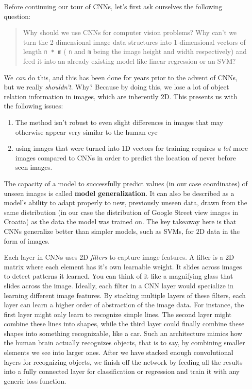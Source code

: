 \documentclass[]{article}
\providecommand{\tightlist}{%
  \setlength{\itemsep}{0pt}\setlength{\parskip}{0pt}}
\let\oldtexttt\texttt
\renewcommand{\texttt}[1]{
  \textcolor{tcolor}{\colorbox{bgcolor}{\oldtexttt{#1}}}
}
\begin{document}
Before continuing our tour of CNNs, let's first ask ourselves the
following question:

\begin{quote}
Why should we use CNNs for computer vision problems? Why can't we turn
the 2-dimensional image data structures into 1-dimensional vectors of
length \texttt{n\ *\ m} (\texttt{n} and \texttt{m} being the image
height and width respectively) and feed it into an already existing
model like linear regression or an SVM?
\end{quote}

We \emph{can} do this, and this has been done for years prior to the
advent of CNNs, but we really \emph{shouldn't}. Why? Because by doing
this, we lose a lot of object relation information in images, which are
inherently 2D. This presents us with the following issues:

\begin{enumerate}
\def\labelenumi{\arabic{enumi}.}
\tightlist
\item
  The method isn't robust to even slight differences in images that may
  otherwise appear very similar to the human eye
\item
  using images that were turned into 1D vectors for training requires
  \emph{a lot} more images compared to CNNs in order to predict the
  location of never before seen images.
\end{enumerate}

The capacity of a model to successfully predict values (in our case
coordinates) of unseen images is called \textbf{model generalization}.
It can also be described as a model's ability to adapt properly to new,
previously unseen data, drawn from the same distribution (in our case
the distribution of Google Street view images in Croatia) as the data
the model was trained on. The key takeaway here is that CNNs generalize
better than simpler models, such as SVMs, for 2D data in the form of
images.

Each layer in CNNs uses 2D \emph{filters} to capture image features. A
filter is a 2D matrix where each element has it's own learnable weight.
It slides across images to detect patterns it learned. You can think of
it like a magnifying glass that slides across the image. Ideally, each
filter in a CNN layer would specialize in learning different image
features. By stacking multiple layers of these filters, each layer can
learn a higher order of abstraction of the image data. For instance, the
first layer might only learn to recognize simple lines. The second layer
might combine these lines into shapes, while the third layer could
finally combine these shapes into something recognizable, like a car.
Such an architecture mimics how the human brain actually recognizes
objects, that is to say, by combining smaller elements we see into
larger ones. After we have stacked enough convolutional layers for
recognizing objects, we finish off the network by feeding all the
results into a fully connected layer for classification or regression
and train it with any generic loss function.
\end{document}
